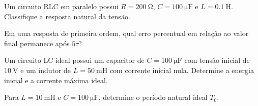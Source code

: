 \begin{questao}[2]{}

Um circuito RLC em paralelo possui $R=\SI{200}{\ohm}$, $C=\SI{100}{\micro\farad}$ e
$L=\SI{0.1}{\henry}$. Classifique a resposta natural da tensão.


\end{questao}
\begin{questao}[2]{}

Em uma resposta de primeira ordem, qual erro percentual em relação ao valor final
permanece após $5\tau$?


\end{questao}
\begin{questao}[2]{}

Um circuito LC ideal possui um capacitor de $C=\SI{100}{\micro\farad}$
com tensão inicial de $\SI{10}{\volt}$ e um indutor de
$L=\SI{50}{\milli\henry}$ com corrente inicial nula.
Determine a energia inicial e a corrente máxima ideal.


\end{questao}
\begin{questao}[2]{}

Para $L=\SI{10}{\milli\henry}$ e $C=\SI{100}{\micro\farad}$, determine o
período natural ideal $T_0$.


\end{questao}

\gabarito[Nível 2]

